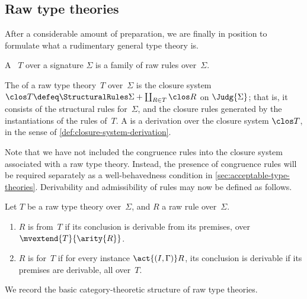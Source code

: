 \subsection{Raw type theories}

After a considerable amount of preparation, we are finally in position to formulate what a rudimentary general type theory is.

\begin{definition}
  \label{def:raw-type-theory}%
  A ~$T$ over a signature $\Sigma$ is a family of raw rules over~$\Sigma$.
\end{definition}

\begin{definition} \label{def:closure-system-of-type-theory}
  The  of a raw type theory~$T$ over~$\Sigma$ is the closure system $\clos T \defeq \StructuralRules \Sigma + \coprod_{R \in T} \clos R$ on $\Judg{\Sigma}$; that is, it consists of the structural rules for~$\Sigma$, and the closure rules generated by the instantiations of the rules of~$T$.
  A  is a derivation over the closure system $\clos T$, in the sense of \cref{def:closure-system-derivation}.
\end{definition}

Note that we have not included the congruence rules into the closure system associated with a raw type theory. Instead, the presence of congruence rules will be required separately as a well-behavedness condition in \cref{sec:acceptable-type-theories}.
%
Derivability and admissibility of rules may now be defined as follows.

\begin{definition} \label{def:derivable-raw-rule}
  Let $T$ be a raw type theory over~$\Sigma$, and $R$ a raw rule over~$\Sigma$.
  \begin{enumerate}
  \item $R$ is  from~$T$ if its conclusion is derivable from its premises, over $\mvextend{T}{\arity{R}}$.
  \item $R$ is  for~$T$ if for every instance $\act{(I,\Gamma)}R$,
    its conclusion is derivable if its premises are derivable, all over~$T$.
  \end{enumerate}
\end{definition}

We record the basic category-theoretic structure of raw type theories.

